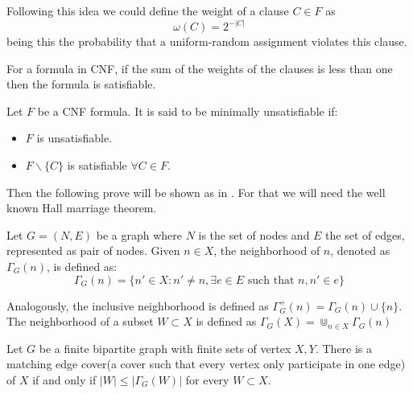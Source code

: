 Following this idea we could define the weight of a clause $C\in F$ as $$\omega(C) = 2^{-|C|} $$
being this the probability that a uniform-random assignment violates this clause. 

\begin{corollary}
	For a formula in CNF, if the sum of the weights of the clauses is less than one then the formula is satisfiable.
\end{corollary}





\begin{definition}
Let $F$ be a CNF formula. It is said to be minimally unsatisfiable if:
\begin{itemize}
	\item $F$ is unsatisfiable.
	\item $F\backslash \{C\}$ is satisfiable $\forall C \in F$.
\end{itemize}
\end{definition}


Then the following prove will be shown as in \cite{schoning2013satisfiability}. For that we will need the well known Hall marriage theorem\cite{hall2009representatives}.

\begin{definition}
  Let $G=(N,E)$ be a graph where $N$ is the set of nodes and $E$ the set of edges, represented as pair of nodes. Given $n \in X$,  the neighborhood of $n$, denoted as $\Gamma_G(n)$, is defined as:
	$$ \Gamma_G(n) = \{ n' \in X : n'\ne n, \exists e \in E \text{ such that } n,n' \in e\}$$
	
        Analogously, the inclusive neighborhood is defined as $\Gamma_G^+(n) = \Gamma_G(n) \cup \{n\}$. The neighborhood of a subset $W \subset X$ is defined as $\Gamma_G(X) = \Cup_{n\in X} \Gamma_G(n)$
\end{definition}


\begin{theorem}
  Let $G$ be a finite bipartite graph with finite sets of vertex $X,Y$. There is a matching edge cover(a cover such that every vertex only participate in one edge) of $X$ if and only if $|W| \le |\Gamma_G(W)|$ for every $W\subset X$.  
\end{theorem}


